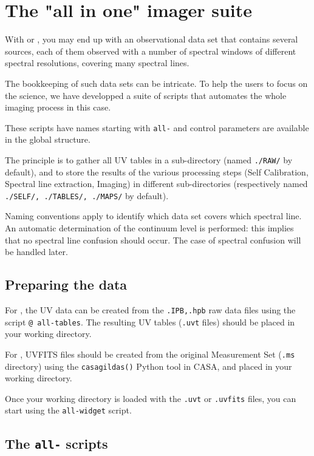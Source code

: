 \section{The "all in one" imager suite}
\label{sec:all}

With \ALMA{} or \NOEMA{}, you may end up with an observational data set
that contains several sources, each of them observed with
a number of spectral windows of different spectral resolutions,
covering many spectral lines. 

The bookkeeping of such data sets can be intricate. To help the
users to focus on the science, we have developped a suite of
scripts that automates the whole imaging process in this case.

These scripts have names starting with \texttt{all-}  and control
parameters are available in the  global structure.

The principle is to gather all UV tables in a sub-directory (named
\texttt{./RAW/} by default), and to store the results of the
various processing steps (Self Calibration,  Spectral line
extraction, Imaging) in different sub-directories (respectively 
named \texttt{./SELF/, ./TABLES/, ./MAPS/} by default).

Naming conventions apply to identify which data set covers which 
spectral line. An automatic determination of the continuum
level is performed: this implies that no spectral line
confusion should occur.  The case of spectral confusion will be
handled later.

\subsection{Preparing the data}

For \NOEMA{}, the UV data can be created from the \texttt{.IPB,.hpb}
raw data files using the \clic{}  script \texttt{@ all-tables}. The 
resulting UV tables (\texttt{.uvt} files) should be placed in your
working directory.

For \ALMA{},  UVFITS files should be created from the original Measurement
Set (\texttt{.ms} directory) using the \texttt{casagildas()} Python tool 
in CASA, and placed in your working directory. 

Once your working directory is loaded with the \texttt{.uvt} or 
\texttt{.uvfits} files, you can start using the \texttt{all-widget}
script.


\subsection{The \texttt{all-} scripts}

